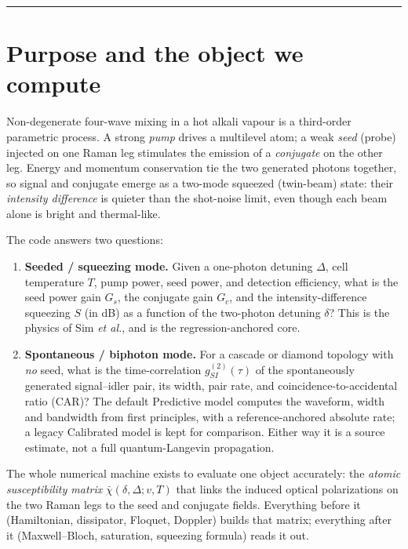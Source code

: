 \documentclass[11pt]{article}
\newcommand{\rhobar}{\bar{\chi}}
\begin{document}
\tableofcontents
\bigskip\hrule

\section{Purpose and the object we compute}

Non-degenerate four-wave mixing in a hot alkali vapour is a third-order parametric
process. A strong \emph{pump} drives a multilevel atom; a weak \emph{seed} (probe)
injected on one Raman leg stimulates the emission of a \emph{conjugate} on the
other leg. Energy and momentum conservation tie the two generated photons
together, so signal and conjugate emerge as a two-mode squeezed (twin-beam) state:
their \emph{intensity difference} is quieter than the shot-noise limit, even though
each beam alone is bright and thermal-like.

The code answers two questions:

\begin{enumerate}[leftmargin=2.2em]
  \item \textbf{Seeded / squeezing mode.} Given a one-photon detuning $\Delta$,
  cell temperature $T$, pump power, seed power, and detection efficiency, what is
  the seed power gain $G_s$, the conjugate gain $G_c$, and the intensity-difference
  squeezing $S$ (in dB) as a function of the two-photon detuning $\delta$? This is
  the physics of Sim \emph{et al.}, and is the regression-anchored core.
  \item \textbf{Spontaneous / biphoton mode.} For a cascade or diamond topology
  with \emph{no} seed, what is the time-correlation $g^{(2)}_{SI}(\tau)$ of the
  spontaneously generated signal--idler pair, its width, pair rate, and
  coincidence-to-accidental ratio (CAR)? The default Predictive model computes
  the waveform, width and bandwidth from first principles, with a
  reference-anchored absolute rate; a legacy Calibrated model is kept for
  comparison. Either way it is a source estimate, not a full quantum-Langevin
  propagation.
\end{enumerate}

The whole numerical machine exists to evaluate one object accurately: the
\emph{atomic susceptibility matrix} $\rhobar(\delta,\Delta;v,T)$ that links the
induced optical polarizations on the two Raman legs to the seed and conjugate
fields. Everything before it (Hamiltonian, dissipator, Floquet, Doppler) builds
that matrix; everything after it (Maxwell--Bloch, saturation, squeezing formula)
reads it out.
\end{document}

